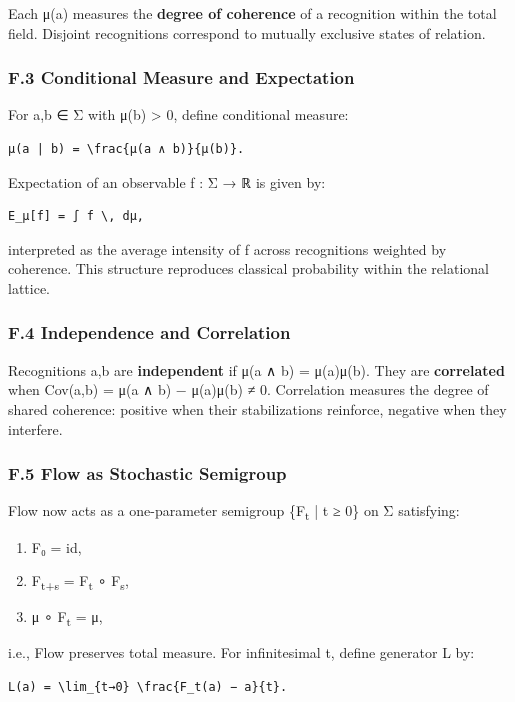 \documentclass[11pt]{article}
\begin{document}
Each μ(a) measures the \textbf{degree of coherence} of a recognition within the total field.  
Disjoint recognitions correspond to mutually exclusive states of relation.
\subsubsection*{F.3 Conditional Measure and Expectation}
\label{sec:org0077a46}
For a,b ∈ Σ with μ(b) > 0, define conditional measure:

\begin{verbatim}
μ(a | b) = \frac{μ(a ∧ b)}{μ(b)}.
\end{verbatim}

Expectation of an observable f : Σ → ℝ is given by:

\begin{verbatim}
E_μ[f] = ∫ f \, dμ,
\end{verbatim}

interpreted as the average intensity of f across recognitions weighted by coherence.  
This structure reproduces classical probability within the relational lattice.
\subsubsection*{F.4 Independence and Correlation}
\label{sec:orgeb7ecc0}
Recognitions a,b are \textbf{independent} if  
μ(a ∧ b) = μ(a)μ(b).  
They are \textbf{correlated} when  
Cov(a,b) = μ(a ∧ b) − μ(a)μ(b) ≠ 0.  
Correlation measures the degree of shared coherence:  
positive when their stabilizations reinforce, negative when they interfere.
\subsubsection*{F.5 Flow as Stochastic Semigroup}
\label{sec:org8e7e298}
Flow now acts as a one-parameter semigroup \{F\textsubscript{t} | t ≥ 0\} on Σ satisfying:

\begin{enumerate}
\item F₀ = id,
\item F\textsubscript{t+s} = F\textsubscript{t} ∘ F\textsubscript{s},
\item μ ∘ F\textsubscript{t} = μ,
\end{enumerate}

i.e., Flow preserves total measure.  
For infinitesimal t, define generator L by:

\begin{verbatim}
L(a) = \lim_{t→0} \frac{F_t(a) − a}{t}.
\end{verbatim}
\end{document}
